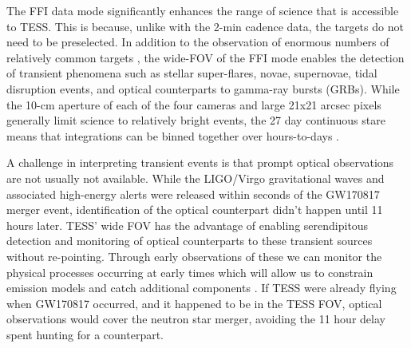 \documentclass[modern]{aastex61}
\newcommand{\red}[1]{\textcolor{red}{#1}}
\begin{document}
The FFI data mode significantly enhances the range of science that is accessible to TESS. This is because, unlike with the 2-min cadence data, the targets do not need to be preselected. In addition to the observation of enormous numbers of relatively common targets \citep[e.g.][]{Thomas2016,Raddi2017}, the wide-FOV of the FFI mode enables the detection of transient phenomena such as stellar super-flares, novae, supernovae, tidal disruption events, and optical counterparts to gamma-ray bursts (GRBs). While the 10-cm aperture of each of the four cameras and large 21x21 arcsec pixels generally limit science to relatively bright events, the 27 day continuous stare means that integrations can be binned together over hours-to-days \citep[e.g.][]{Pal2015}. 

A challenge in interpreting transient events is that prompt optical observations are not usually not available. While the LIGO/Virgo gravitational waves and associated high-energy alerts were released within seconds of the GW170817 merger event, identification of the optical counterpart didn't happen until 11 hours later. TESS' wide FOV has the advantage of enabling serendipitous detection and monitoring of optical counterparts to these transient sources without re-pointing. Through early observations of these we can monitor the physical processes occurring at early times which will allow us to constrain emission models and catch additional components \citep[e.g.][]{Racusin2008}.  %
If TESS were already flying when GW170817 occurred, and it happened to be in the TESS FOV, optical observations would cover the neutron star merger, avoiding the 11 hour delay spent hunting for a counterpart. %
\end{document}
